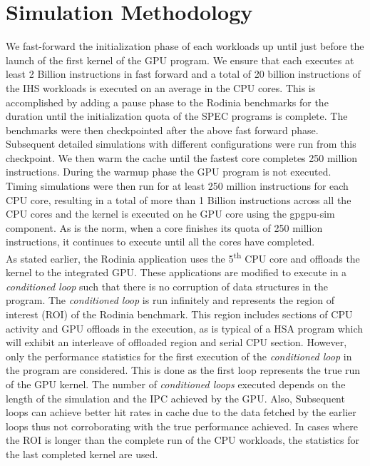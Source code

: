 \section{Simulation Methodology} \label{simulation-methodology}
We fast-forward the initialization phase of each workloads up until just before the launch of the first kernel of the GPU program. We ensure that each executes at least 2 Billion instructions in fast forward and a total of 20 billion instructions of the IHS workloads is executed on an average in the CPU cores. This is accomplished by adding a pause phase to the Rodinia benchmarks for the duration until the initialization quota of the SPEC programs is complete. The benchmarks were then checkpointed after the above fast forward phase. Subsequent detailed simulations with different configurations were run from this checkpoint.
We then warm the cache until the fastest core completes 250 million instructions. During the warmup phase the GPU program is not executed. Timing simulations were then run for at least 250 million instructions for each CPU core, resulting in a total of more than 1 Billion instructions across all the CPU cores and the kernel is executed on he GPU core using the gpgpu-sim component. As is the norm, when a core finishes its quota of 250 million instructions, it continues to execute until all the cores have completed. \\
As stated earlier, the Rodinia application uses the 5\textsuperscript{th} CPU core and offloads the kernel to the integrated GPU. These applications are modified to execute in a \textit{conditioned loop} such that there is no corruption of data structures in the program. The \textit{conditioned loop} is run infinitely and represents the region of interest (ROI) of the Rodinia benchmark. This region includes sections of CPU activity and GPU offloads in the execution, as is typical of a HSA program which will exhibit an interleave of offloaded region and serial CPU section. However, only the performance statistics for the first execution of the \textit{conditioned loop} in the program are considered. 
This is done as the first loop represents the true run of the GPU kernel. The number of \textit{conditioned loops} executed depends on the length of the simulation and the IPC achieved by the GPU. Also, Subsequent loops can achieve better hit rates in cache due to the data fetched by the earlier loops thus not corroborating with the true performance achieved.
In cases where the ROI is longer than the complete run of the CPU workloads, the statistics for the last completed kernel are used. 

